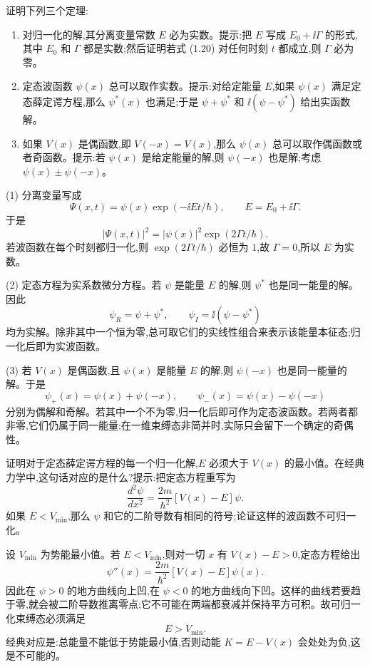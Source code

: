 \begin{question}
证明下列三个定理:
\begin{enumerate}
\item 对归一化的解,其分离变量常数 $E$ 必为实数。提示:把 $E$ 写成 $E_0+\ii\Gamma$ 的形式,其中 $E_0$ 和 $\Gamma$ 都是实数;然后证明若式 (1.20) 对任何时刻 $t$ 都成立,则 $\Gamma$ 必为零。
\item 定态波函数 $\psi(x)$ 总可以取作实数。提示:对给定能量 $E$,如果 $\psi(x)$ 满足定态薛定谔方程,那么 $\psi^*(x)$ 也满足;于是 $\psi+\psi^*$ 和 $\ii(\psi-\psi^*)$ 给出实函数解。
\item 如果 $V(x)$ 是偶函数,即 $V(-x)=V(x)$,那么 $\psi(x)$ 总可以取作偶函数或者奇函数。提示:若 $\psi(x)$ 是给定能量的解,则 $\psi(-x)$ 也是解;考虑 $\psi(x)\pm\psi(-x)$。
\end{enumerate}

\par\smallskip
{}

\begin{solution}
(1) 分离变量写成
\[
\Psi(x,t)=\psi(x)\exp(-\ii Et/\hbar),\qquad E=E_0+\ii\Gamma .
\]
于是
\[
|\Psi(x,t)|^2=|\psi(x)|^2\exp(2\Gamma t/\hbar).
\]
若波函数在每个时刻都归一化,则 $\exp(2\Gamma t/\hbar)$ 必恒为 $1$,故 $\Gamma=0$,所以 $E$ 为实数。

(2) 定态方程为实系数微分方程。若 $\psi$ 是能量 $E$ 的解,则 $\psi^*$ 也是同一能量的解。因此
\[
\psi_R=\psi+\psi^*,\qquad \psi_I=\ii(\psi-\psi^*)
\]
均为实解。除非其中一个恒为零,总可取它们的实线性组合来表示该能量本征态;归一化后即为实波函数。

(3) 若 $V(x)$ 是偶函数,且 $\psi(x)$ 是能量 $E$ 的解,则 $\psi(-x)$ 也是同一能量的解。于是
\[
\psi_+(x)=\psi(x)+\psi(-x),\qquad \psi_-(x)=\psi(x)-\psi(-x)
\]
分别为偶解和奇解。若其中一个不为零,归一化后即可作为定态波函数。若两者都非零,它们仍属于同一能量;在一维束缚态非简并时,实际只会留下一个确定的奇偶性。
\end{solution}
\end{question}

\begin{question}
证明对于定态薛定谔方程的每一个归一化解,$E$ 必须大于 $V(x)$ 的最小值。在经典力学中,这句话对应的是什么?提示:把定态方程重写为
\[
\frac{d^2\psi}{dx^2}=\frac{2m}{\hbar^2}[V(x)-E]\psi .
\]
如果 $E<V_{\min}$,那么 $\psi$ 和它的二阶导数有相同的符号;论证这样的波函数不可归一化。
\begin{solution}
设 $V_{\min}$ 为势能最小值。若 $E<V_{\min}$,则对一切 $x$ 有 $V(x)-E>0$,定态方程给出
\[
\psi''(x)=\frac{2m}{\hbar^2}[V(x)-E]\psi(x).
\]
因此在 $\psi>0$ 的地方曲线向上凹,在 $\psi<0$ 的地方曲线向下凹。这样的曲线若要趋于零,就会被二阶导数推离零点;它不可能在两端都衰减并保持平方可积。故可归一化束缚态必须满足
\[
E>V_{\min}.
\]
经典对应是:总能量不能低于势能最小值,否则动能 $K=E-V(x)$ 会处处为负,这是不可能的。
\end{solution}
\end{question}

